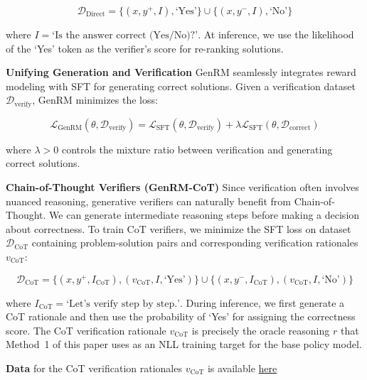 \begin{equation}
    \mathcal{D}_{\text{Direct}} = \{(x,y^+,I), \text{`Yes'}\} \cup \{(x,y^-,I), \text{`No'}\}
\end{equation}

where $I = \text{`Is the answer correct (Yes/No)?'}$. At inference, we use the likelihood of the `Yes' token as the verifier's score for re-ranking solutions.

\vspace{1em}
\textbf{Unifying Generation and Verification}
GenRM seamlessly integrates reward modeling with SFT for generating correct solutions. Given a verification dataset $\mathcal{D}_{\text{verify}}$, GenRM minimizes the loss:

\begin{equation}
    \mathcal{L}_{\text{GenRM}}(\theta, \mathcal{D}_{\text{verify}}) = \mathcal{L}_{\text{SFT}}(\theta, \mathcal{D}_{\text{verify}}) + \lambda\mathcal{L}_{\text{SFT}}(\theta, \mathcal{D}_{\text{correct}})
\end{equation}

where $\lambda > 0$ controls the mixture ratio between verification and generating correct solutions.

\vspace{1em}
\textbf{Chain-of-Thought Verifiers (GenRM-CoT)}
Since verification often involves nuanced reasoning, generative verifiers can naturally benefit from Chain-of-Thought. We can generate intermediate reasoning steps before making a decision about correctness. To train CoT verifiers, we minimize the SFT loss on dataset $\mathcal{D}_{\text{CoT}}$ containing problem-solution pairs and corresponding verification rationales $v_{\text{CoT}}$:

\begin{equation}
    \mathcal{D}_{\text{CoT}} = \{(x,y^+,I_{\text{CoT}}), (v_{\text{CoT}},I,\text{`Yes'})\} \cup \{(x,y^-,I_{\text{CoT}}), (v_{\text{CoT}},I,\text{`No'})\}
\end{equation}

where $I_{\text{CoT}} = \text{`Let's verify step by step.'}$. During inference, we first generate a CoT rationale and then use the probability of `Yes' for assigning the correctness score. The CoT verification rationale $v_{\text{CoT}}$ is precisely the oracle reasoning $r$ that Method~1 of this paper uses as an NLL training target for the base policy model.

\vspace{1em}
\textbf{Data} for the CoT verification rationales $v_{\text{CoT}}$ is available \href{https://github.com/gen-agent/genrm-data/tree/main}{here}

